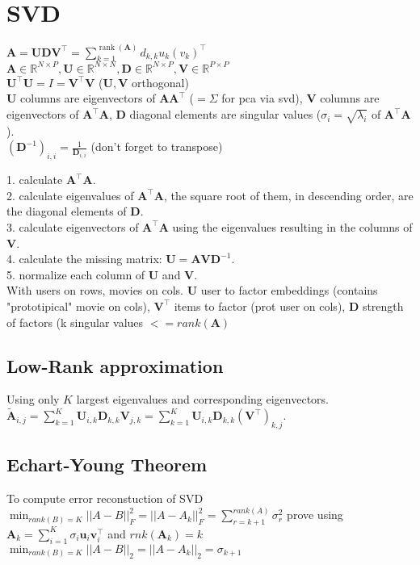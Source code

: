 \section{SVD}
$\mathbf{A} = \mathbf{U} \mathbf{D} \mathbf{V}^\top = \sum_{k=1}^{\operatorname{rank}(\mathbf{A})} d_{k,k} u_k (v_k)^\top$\\
$\mathbf{A} \in \mathbb{R}^{N \times P}, \mathbf{U} \in \mathbb{R}^{N \times N}, \mathbf{D} \in \mathbb{R}^{N \times P}, \mathbf{V} \in \mathbb{R}^{P \times P}$\\
$\mathbf{U}^\top \mathbf{U} = I = \mathbf{V}^\top \mathbf{V}$ ($\mathbf{U}, \mathbf{V}$ orthogonal)\\
$\mathbf{U}$ columns are eigenvectors of $\mathbf{A} \mathbf{A}^\top$ ($=\Sigma$ for pca via svd), $\mathbf{V}$ columns are eigenvectors of $\mathbf{A}^\top \mathbf{A}$, $\mathbf{D}$ diagonal elements are singular values ($\sigma _i = \sqrt{\lambda _i}$ of $\mathbf{A}^\top \mathbf{A}$).\\
$(\mathbf{D}^{-1})_{i,i} = \frac{1}{\mathbf{D}_{i, i}}$ (don't forget to transpose)

1. calculate $\mathbf{A}^\top \mathbf{A}$.\\
2. calculate eigenvalues of $\mathbf{A}^\top \mathbf{A}$, the square root of them, in descending order, are the diagonal elements of $\mathbf{D}$.\\
3. calculate eigenvectors of $\mathbf{A}^\top \mathbf{A}$ using the eigenvalues resulting in the columns of $\mathbf{V}$.\\
4. calculate the missing matrix: $\mathbf{U} = \mathbf{A} \mathbf{V} \mathbf{D}^{-1}$.\\
5. normalize each column of $\mathbf{U}$ and $\mathbf{V}$.\\

With users on rows, movies on cols. $\mathbf{U}$ user to factor embeddings (contains "prototipical" movie on cols), $\mathbf{V}^\top$ items to factor (prot user on cols), $\mathbf{D}$ strength of factors (k singular values $<= rank(\mathbf{A})$

\subsection*{Low-Rank approximation}
Using only $K$ largest eigenvalues and corresponding eigenvectors. $\tilde{\mathbf{A}}_{i, j} = \sum_{k=1}^K \mathbf{U}_{i, k} \mathbf{D}_{k,k} \mathbf{V}_{j, k} = \sum_{k=1}^K \mathbf{U}_{i, k} \mathbf{D}_{k,k} (\mathbf{V}^\top)_{k, j}$.

\subsection*{Echart-Young Theorem}
To compute error reconstuction of SVD
$\min_{rank(B)=K} ||A-B||_F^2 = ||A-A_k||_F^2 = \sum_{r=k+1}^{rank(A)} \sigma_r^2$ prove using $\mathbf{A}_k = \sum_{i=1}^K \sigma_i \mathbf{u}_i \mathbf{v}_i^\top$ and $rnk(\mathbf{A}_k) = k$
$\min_{rank(B)=K} ||A-B||_2 = ||A-A_k||_2 = \sigma_{k+1}$
